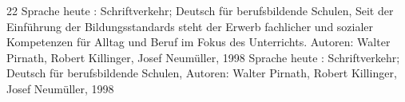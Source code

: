\begin{thebibliography}{22}
    Sprache heute : Schriftverkehr; Deutsch für berufsbildende Schulen,\newline 
Seit der Einführung der Bildungsstandards steht der Erwerb fachlicher und sozialer Kompetenzen für Alltag und Beruf im Fokus des Unterrichts.\newline
Autoren: Walter Pirnath, Robert Killinger, Josef Neumüller, 1998
%
    Sprache heute : Schriftverkehr; Deutsch für berufsbildende Schulen,\newline 
Autoren: Walter Pirnath, Robert Killinger, Josef Neumüller, 1998
%
\end{thebibliography}
%